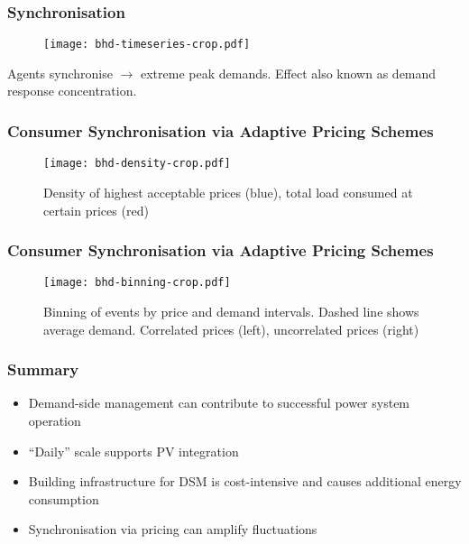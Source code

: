 \documentclass[10pt,aspectratio=169,dvipsnames]{beamer}
\let\olditem\item
\renewcommand{\item}{%
\olditem\vspace{5pt}}
\begin{document}
\begin{frame}
 \frametitle{Synchronisation}

   \begin{figure}
     \texttt{[image: bhd-timeseries-crop.pdf]}
  \end{figure}

 Agents synchronise $\rightarrow$ extreme peak demands. Effect also known as demand response concentration.
\end{frame}
\begin{frame}
  \frametitle{Consumer Synchronisation via Adaptive Pricing Schemes}

    \begin{figure}
     \texttt{[image: bhd-density-crop.pdf]}
     \caption{Density of highest acceptable prices (blue), total load consumed at certain prices (red)}

  \end{figure}
  \end{frame}
\begin{frame}
  \frametitle{Consumer Synchronisation via Adaptive Pricing Schemes}

    \begin{figure}
     \texttt{[image: bhd-binning-crop.pdf]}
    \caption{Binning of events by price and demand intervals. Dashed line shows average demand. Correlated prices (left), uncorrelated prices (right)}
  \end{figure}
  \end{frame}
  \begin{frame}
   \frametitle{Summary}

   \begin{itemize}
    \item Demand-side management can contribute to successful power system operation
    \item ``Daily'' scale supports PV integration
    \item Building infrastructure for DSM is cost-intensive and causes additional energy consumption
    \item Synchronisation via pricing can amplify fluctuations
   \end{itemize}


  \end{frame}
\end{document}
